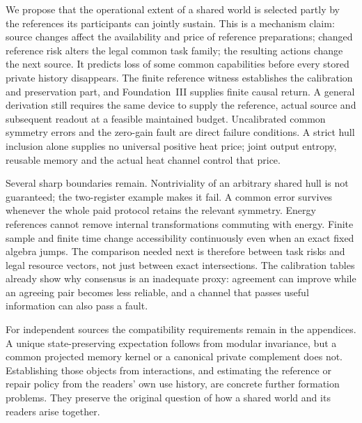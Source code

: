 We propose that the operational extent of a shared world is selected partly
by the references its participants can jointly sustain. This is a mechanism
claim: source changes affect the availability and price of reference
preparations; changed reference risk alters the legal common task family;
the resulting actions change the next source. It predicts loss of some common
capabilities before every stored private history disappears. The finite
reference witness establishes the calibration and preservation part, and
Foundation~III supplies finite causal return. A general derivation still
requires the same device to supply the reference, actual source and subsequent
readout at a feasible maintained budget. Uncalibrated common symmetry errors
and the zero-gain fault are direct failure conditions. A strict hull inclusion
alone supplies no universal positive heat price; joint output entropy,
reusable memory and the actual heat channel control that price.

Several sharp boundaries remain. Nontriviality of an arbitrary shared hull
is not guaranteed; the two-register example makes it fail. A common error
survives whenever the whole paid protocol retains the relevant symmetry.
Energy references cannot remove internal transformations commuting with
energy. Finite sample and finite time change accessibility continuously even
when an exact fixed algebra jumps. The comparison needed next is therefore
between task risks and legal resource vectors, not just between exact
intersections. The calibration tables already show why consensus is an
inadequate proxy: agreement can improve while an agreeing pair becomes less
reliable, and a channel that passes useful information can also pass a fault.

For independent sources the compatibility requirements remain in the
appendices. A unique state-preserving expectation follows from modular
invariance, but a common projected memory kernel or a canonical private
complement does not. Establishing those objects from interactions, and
estimating the reference or repair policy from the readers' own use history,
are concrete further formation problems. They preserve the original question
of how a shared world and its readers arise together.

